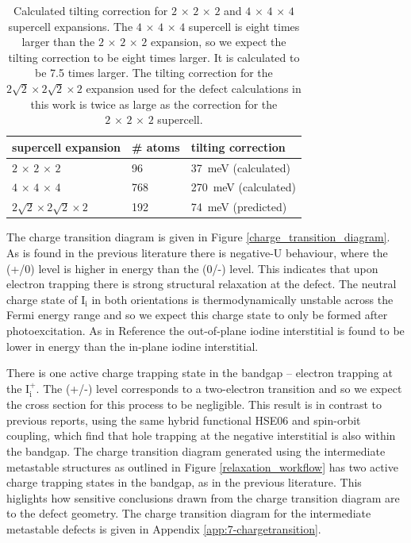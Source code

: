 \begin{table}[h!]\centering
\begin{tabular}{lll}\toprule
supercell expansion&\# atoms&tilting correction \\ 
\midrule
$2\,\times\,2\,\times\,2$ & 96 & \SI{37}{meV} (calculated) \\
$4\,\times\,4\,\times\,4$ & 768 & \SI{270}{meV} (calculated) \\
$2\sqrt2\times2\sqrt2\times2$ & 192 & \SI{74}{meV} (predicted) \\
\bottomrule
\end{tabular} 
\caption[Tilting correction for $2\,\times\,2\,\times\,2$ and $4\,\times\,4\,\times\,4$ supercell expansions]{\label{modemaptable} Calculated tilting correction for $2\,\times\,2\,\times\,2$ and $4\,\times\,4\,\times\,4$ supercell expansions. The $4\,\times\,4\,\times\,4$ supercell is eight times larger than the $2\,\times\,2\,\times\,2$ expansion, so we expect the tilting correction to be eight times larger. It is calculated to be 7.5 times larger. The tilting correction for the $2\sqrt2\times2\sqrt2\times2$ expansion used for the defect calculations in this work is twice as large as the correction for the $2\,\times\,2\,\times\,2$ supercell. }
\end{table}

The charge transition diagram is given in Figure \ref{charge_transition_diagram}. 
As is found in the previous literature\autocite{Du2015,Meggiolaro2018} there is negative-U behaviour, where the (+/0) level is higher in energy than the (0/-) level. This indicates that upon electron trapping there is strong structural relaxation at the defect. The neutral charge state of $\mathrm{I}_\mathrm{i}$ in both orientations is thermodynamically unstable across the Fermi energy range and so we expect this charge state to only be formed after photoexcitation. As in Reference \cite{Meggiolaro2018} the out-of-plane iodine interstitial is found to be lower in energy than the in-plane iodine interstitial.

There is one active charge trapping state in the bandgap -- electron trapping at the $\mathrm{I}_\mathrm{i}^+$.  The (+/-) level corresponds to a two-electron transition and so we expect the cross section for this process to be negligible. This result is in contrast to previous reports, using the same hybrid functional HSE06 and spin-orbit coupling, which find that hole trapping at the negative interstitial is also within the bandgap.
The charge transition diagram generated using the intermediate metastable structures as outlined in Figure \ref{relaxation_workflow} has two active charge trapping states in the bandgap, as in the previous literature. This higlights how sensitive conclusions drawn from the charge transition diagram are to the defect geometry. The charge transition diagram for the intermediate metastable defects is given in Appendix \ref{app:7-chargetransition}.


